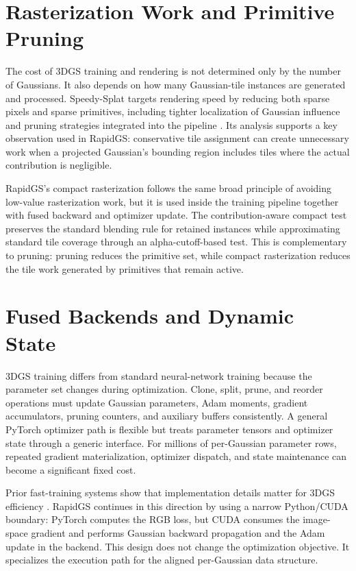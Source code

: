 \section{Rasterization Work and Primitive Pruning}

The cost of 3DGS training and rendering is not determined only by the number of Gaussians. It also depends on how many Gaussian-tile instances are generated and processed. Speedy-Splat targets rendering speed by reducing both sparse pixels and sparse primitives, including tighter localization of Gaussian influence and pruning strategies integrated into the pipeline \cite{Hanson2024SpeedySplat}. Its analysis supports a key observation used in RapidGS: conservative tile assignment can create unnecessary work when a projected Gaussian's bounding region includes tiles where the actual contribution is negligible.

RapidGS's compact rasterization follows the same broad principle of avoiding low-value rasterization work, but it is used inside the training pipeline together with fused backward and optimizer update. The contribution-aware compact test preserves the standard blending rule for retained instances while approximating standard tile coverage through an alpha-cutoff-based test. This is complementary to pruning: pruning reduces the primitive set, while compact rasterization reduces the tile work generated by primitives that remain active.

\section{Fused Backends and Dynamic State}

3DGS training differs from standard neural-network training because the parameter set changes during optimization. Clone, split, prune, and reorder operations must update Gaussian parameters, Adam moments, gradient accumulators, pruning counters, and auxiliary buffers consistently. A general PyTorch optimizer path is flexible but treats parameter tensors and optimizer state through a generic interface. For millions of per-Gaussian parameter rows, repeated gradient materialization, optimizer dispatch, and state maintenance can become a significant fixed cost.

Prior fast-training systems show that implementation details matter for 3DGS efficiency \cite{MallickSIGGRAPHAsia2024Taming3DGS,Hahlbohm2026FasterGS}. RapidGS continues in this direction by using a narrow Python/CUDA boundary: PyTorch computes the RGB loss, but CUDA consumes the image-space gradient and performs Gaussian backward propagation and the Adam update in the backend. This design does not change the optimization objective. It specializes the execution path for the aligned per-Gaussian data structure.


